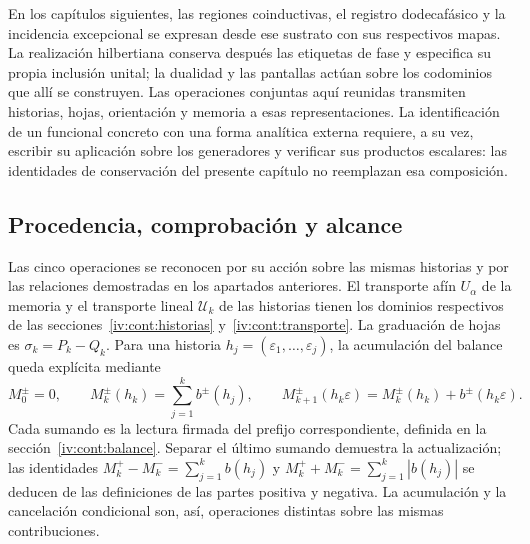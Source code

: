 En los capítulos siguientes, las regiones coinductivas, el registro dodecafásico y la incidencia excepcional se expresan desde ese sustrato con sus respectivos mapas. La realización hilbertiana conserva después las etiquetas de fase y especifica su propia inclusión unital; la dualidad y las pantallas actúan sobre los codominios que allí se construyen. Las operaciones conjuntas aquí reunidas transmiten historias, hojas, orientación y memoria a esas representaciones. La identificación de un funcional concreto con una forma analítica externa requiere, a su vez, escribir su aplicación sobre los generadores y verificar sus productos escalares: las identidades de conservación del presente capítulo no reemplazan esa composición.

\subsection{Procedencia, comprobación y alcance}
\label{iv:cont:mapa-correlativo}
Las cinco operaciones se reconocen por su acción sobre las mismas
historias y por las relaciones demostradas en los apartados anteriores.
El transporte afín \(U_\alpha\) de la memoria y el transporte
lineal \(\mathcal U_k\) de las historias tienen los dominios
respectivos de las secciones~\ref{iv:cont:historias}
y~\ref{iv:cont:transporte}. La graduación de hojas es
\(\sigma_k=P_k-Q_k\). Para una historia
\(h_j=(\varepsilon_1,\ldots,\varepsilon_j)\), la acumulación del
balance queda explícita mediante
\[
 M_0^\pm=0,\qquad
 M_k^\pm(h_k)=\sum_{j=1}^k b^\pm(h_j),\qquad
 M_{k+1}^\pm(h_k\varepsilon)
 =M_k^\pm(h_k)+b^\pm(h_k\varepsilon).
\]
Cada sumando es la lectura firmada del prefijo correspondiente,
definida en la sección~\ref{iv:cont:balance}. Separar el último
sumando demuestra la actualización; las identidades
\(M_k^+-M_k^-=\sum_{j=1}^kb(h_j)\) y
\(M_k^++M_k^-=\sum_{j=1}^k|b(h_j)|\) se deducen de las
definiciones de las partes positiva y negativa. La acumulación y la
cancelación condicional son, así, operaciones distintas sobre las
mismas contribuciones.

